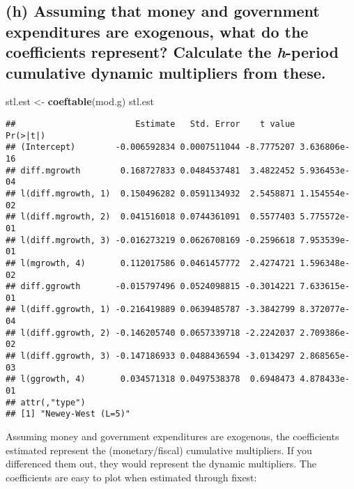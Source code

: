 \documentclass[
]{article}
\newenvironment{Shaded}{\begin{snugshade}}{\end{snugshade}}
\newcommand{\FunctionTok}[1]{\textcolor[rgb]{0.13,0.29,0.53}{\textbf{#1}}}
\newcommand{\NormalTok}[1]{#1}
\newcommand{\OtherTok}[1]{\textcolor[rgb]{0.56,0.35,0.01}{#1}}
\begin{document}
\par\endgroup

\hypertarget{h-assuming-that-money-and-government-expenditures-are-exogenous-what-do-the-coefficients-represent-calculate-the-h-period-cumulative-dynamic-multipliers-from-these.}{%
\subsection{\texorpdfstring{(h) Assuming that money and government
expenditures are exogenous, what do the coefficients represent?
Calculate the \emph{h}-period cumulative dynamic multipliers from
these.}{(h) Assuming that money and government expenditures are exogenous, what do the coefficients represent? Calculate the h-period cumulative dynamic multipliers from these.}}\label{h-assuming-that-money-and-government-expenditures-are-exogenous-what-do-the-coefficients-represent-calculate-the-h-period-cumulative-dynamic-multipliers-from-these.}}

\begin{Shaded}
\begin{Highlighting}[]
\NormalTok{stl.est }\OtherTok{\textless{}{-}} \FunctionTok{coeftable}\NormalTok{(mod.g)}
\NormalTok{stl.est}
\end{Highlighting}
\end{Shaded}

\begin{verbatim}
##                        Estimate   Std. Error    t value     Pr(>|t|)
## (Intercept)        -0.006592834 0.0007511044 -8.7775207 3.636806e-16
## diff.mgrowth        0.168727833 0.0484537481  3.4822452 5.936453e-04
## l(diff.mgrowth, 1)  0.150496282 0.0591134932  2.5458871 1.154554e-02
## l(diff.mgrowth, 2)  0.041516018 0.0744361091  0.5577403 5.775572e-01
## l(diff.mgrowth, 3) -0.016273219 0.0626708169 -0.2596618 7.953539e-01
## l(mgrowth, 4)       0.112017586 0.0461457772  2.4274721 1.596348e-02
## diff.ggrowth       -0.015797496 0.0524098815 -0.3014221 7.633615e-01
## l(diff.ggrowth, 1) -0.216419889 0.0639485787 -3.3842799 8.372077e-04
## l(diff.ggrowth, 2) -0.146205740 0.0657339718 -2.2242037 2.709386e-02
## l(diff.ggrowth, 3) -0.147186933 0.0488436594 -3.0134297 2.868565e-03
## l(ggrowth, 4)       0.034571318 0.0497538378  0.6948473 4.878433e-01
## attr(,"type")
## [1] "Newey-West (L=5)"
\end{verbatim}

Assuming money and government expenditures are exogenous, the
coefficients estimated represent the (monetary/fiscal) cumulative
multipliers. If you differenced them out, they would represent the
dynamic multipliers. The coefficients are easy to plot when estimated
through fixest:
\end{document}
